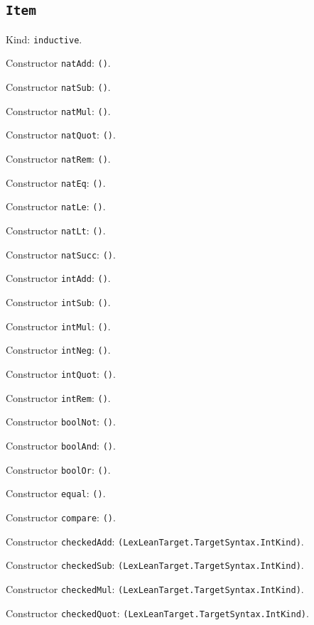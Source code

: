 \documentclass[11pt]{article}
\begin{document}
\subsection*{\texttt{Item}}
\noindent Kind: \texttt{inductive}.\par
\noindent Constructor \texttt{natAdd}: \texttt{()}.\par
\noindent Constructor \texttt{natSub}: \texttt{()}.\par
\noindent Constructor \texttt{natMul}: \texttt{()}.\par
\noindent Constructor \texttt{natQuot}: \texttt{()}.\par
\noindent Constructor \texttt{natRem}: \texttt{()}.\par
\noindent Constructor \texttt{natEq}: \texttt{()}.\par
\noindent Constructor \texttt{natLe}: \texttt{()}.\par
\noindent Constructor \texttt{natLt}: \texttt{()}.\par
\noindent Constructor \texttt{natSucc}: \texttt{()}.\par
\noindent Constructor \texttt{intAdd}: \texttt{()}.\par
\noindent Constructor \texttt{intSub}: \texttt{()}.\par
\noindent Constructor \texttt{intMul}: \texttt{()}.\par
\noindent Constructor \texttt{intNeg}: \texttt{()}.\par
\noindent Constructor \texttt{intQuot}: \texttt{()}.\par
\noindent Constructor \texttt{intRem}: \texttt{()}.\par
\noindent Constructor \texttt{boolNot}: \texttt{()}.\par
\noindent Constructor \texttt{boolAnd}: \texttt{()}.\par
\noindent Constructor \texttt{boolOr}: \texttt{()}.\par
\noindent Constructor \texttt{equal}: \texttt{()}.\par
\noindent Constructor \texttt{compare}: \texttt{()}.\par
\noindent Constructor \texttt{checkedAdd}: \texttt{(LexLeanTarget.TargetSyntax.IntKind)}.\par
\noindent Constructor \texttt{checkedSub}: \texttt{(LexLeanTarget.TargetSyntax.IntKind)}.\par
\noindent Constructor \texttt{checkedMul}: \texttt{(LexLeanTarget.TargetSyntax.IntKind)}.\par
\noindent Constructor \texttt{checkedQuot}: \texttt{(LexLeanTarget.TargetSyntax.IntKind)}.\par
\end{document}
